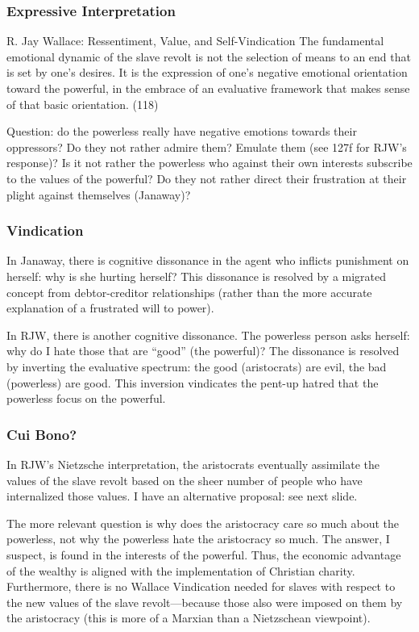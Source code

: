 \documentclass[xcolor=dvipsnames]{beamer}
\begin{document}
\begin{frame}
  \frametitle{Expressive Interpretation}
  \begin{block}{R. Jay Wallace: Ressentiment, Value, and
      Self-Vindication}
    The fundamental emotional dynamic of the slave revolt is not the
    selection of means to an end that is set by one's desires. It is
    the expression of one's negative emotional orientation toward the
    powerful, in the embrace of an evaluative framework that makes
    sense of that basic orientation. (118)
  \end{block}
  Question: do the powerless really have negative emotions towards
  their oppressors? Do they not rather admire them? Emulate them (see
  127f for RJW's response)? Is it not rather the powerless who against
  their own interests subscribe to the values of the powerful? Do they
  not rather direct their frustration at their plight against
  themselves (Janaway)?
\end{frame}

\begin{frame}
  \frametitle{Vindication}
  In Janaway, there is cognitive dissonance in the agent who inflicts
  punishment on herself: why is she hurting herself? This dissonance
  is resolved by a migrated concept from debtor-creditor
  relationships (rather than the more accurate explanation of a
  frustrated will to power).

  \bigskip

  In RJW, there is another cognitive dissonance. The powerless person
  asks herself: why do I hate those that are ``good'' (the powerful)?
  The dissonance is resolved by inverting the evaluative spectrum: the
  good (aristocrats) are evil, the bad (powerless) are good. This
  inversion vindicates the pent-up hatred that the powerless focus on
  the powerful.
\end{frame}

\begin{frame}
  \frametitle{Cui Bono?}
  In RJW's Nietzsche interpretation, the aristocrats eventually
  assimilate the values of the slave revolt based on the sheer number
  of people who have internalized those values. I have an alternative
  proposal: see next slide.

  \bigskip

  The more relevant question is why does the aristocracy care so much
  about the powerless, not why the powerless hate the aristocracy so
  much. The answer, I suspect, is found in the interests of the
  powerful. Thus, the economic advantage of the wealthy is aligned
  with the implementation of Christian charity. Furthermore, there is
  no Wallace Vindication needed for slaves with respect to the new
  values of the slave revolt---because those also were imposed on them
  by the aristocracy (this is more of a Marxian than a Nietzschean
  viewpoint). 
\end{frame}
\end{document}
